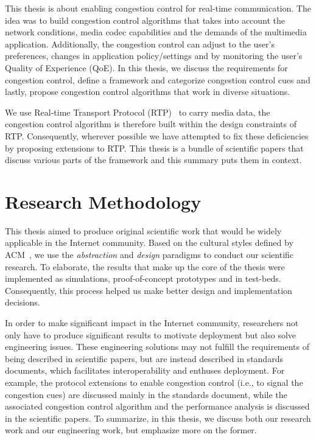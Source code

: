 This thesis is about enabling congestion control for real-time communication.
The idea was to build congestion control algorithms that takes into account
the network conditions, media codec capabilities and the demands of the
multimedia application. Additionally, the congestion control can adjust to the
user's preferences, changes in application policy/settings and by monitoring
the user's Quality of Experience (QoE). In this thesis, we discuss the
requirements for congestion control, define a framework and categorize
congestion control cues and lastly, propose congestion control algorithms
that work in diverse situations.


We use Real-time Transport Protocol (RTP)~\cite{rfc3550} to carry media data,
the congestion control algorithm is therefore built within the design
constraints of RTP. Consequently, wherever possible we have attempted to fix
these deficiencies by proposing extensions to RTP. This thesis is a bundle of
scientific papers that discuss various parts of the framework and this summary
puts them in context.


\section{Research Methodology}

This thesis aimed to produce original scientific work that would be widely
applicable in the Internet community. Based on the cultural styles defined by
ACM~\cite{Denning:CS.Method}, we use the \textit{abstraction} and
\textit{design} paradigms to conduct our scientific research. To elaborate,
the results that make up the core of the thesis were implemented as
simulations, proof-of-concept prototypes and in test-beds. Consequently, this
process helped us make better design and implementation decisions.

In order to make significant impact in the Internet community, researchers not
only have to produce significant results to motivate deployment but also solve
engineering issues. These engineering solutions may not fulfill the
requirements of being described in scientific papers, but are instead
described in standards documents, which facilitates interoperability and
enthuses deployment. For example, the protocol extensions to enable congestion
control (i.e., to signal the congestion cues) are discussed mainly in the
standards document, while the associated congestion control algorithm and the
performance analysis is discussed in the scientific papers. To summarize, in
this thesis, we discuss both our research work and our engineering work, but
emphasize more on the former.



